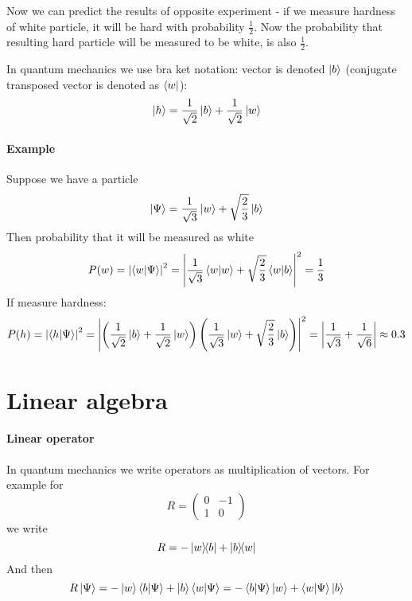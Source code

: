 	
Now we can predict the results of opposite experiment - if we measure hardness of white particle, it will be hard with probability $\frac{1}{2}$. Now the probability that resulting hard particle will be measured to be white, is also $\frac{1}{2}$.

In quantum mechanics we use bra ket notation: vector is denoted $\ket{b}$ (conjugate transposed vector is denoted as $\bra{w}$):
$$\ket{h} = \frac{1}{\sqrt{2}} \ket{b} +  \frac{1}{\sqrt{2}} \ket{w}$$
\paragraph{Example}
Suppose we have a particle 
$$\ket{\Psi} = \frac{1}{\sqrt{3}} \ket{w} + \sqrt{\frac{2}{3}} \ket{b} $$
Then probability that it will be measured as white
$$P(w) = \left|\braket{w}{\Psi}\right|^2 = \left|\frac{1}{\sqrt{3}}\braket{w}{w} + \sqrt{\frac{2}{3}}\braket{w}{b}\right|^2 = \frac{1}{3} $$
If measure hardness:
$$P(h) = \left|\braket{h}{\Psi}\right|^2 = \left|\left(\frac{1}{\sqrt{2}} \ket{b} +  \frac{1}{\sqrt{2}} \ket{w}\right)\left(\frac{1}{\sqrt{3}} \ket{w} + \sqrt{\frac{2}{3}} \ket{b} \right)\right|^2 = \left| \frac{1}{\sqrt{3}} + \frac{1}{\sqrt{6}}\right| \approx 0.3$$
\section{Linear algebra}
\paragraph{Linear operator}
In quantum mechanics we write operators as multiplication of vectors. For example for
$$R = \begin{pmatrix}0&-1\\1&0\end{pmatrix}$$
we write
$$R = - \op{w}{b} + \op{b}{w}$$
And then
$$R\ket{\Psi} = - \ket{w}\braket{b}{\Psi} + \ket{b}\braket{w}{\Psi} = - \braket{b}{\Psi}\ket{w} + \braket{w}{\Psi} \ket{b}$$